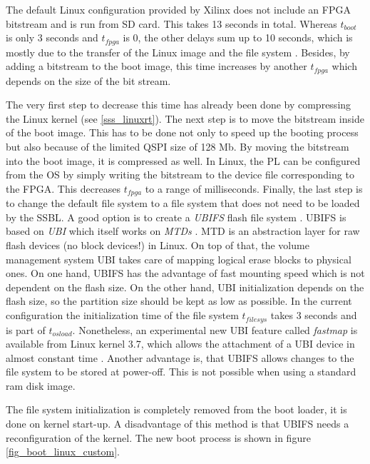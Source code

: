 The default Linux configuration provided by Xilinx does not include an \ac{FPGA} bitstream and is run from \ac{SD} card.
This takes 13 seconds in total.
Whereas $t_{boot}$ is only 3 seconds and $t_{fpga}$ is 0, the other delays sum up to 10 seconds, which is mostly due to the transfer of the Linux image and the file system . 
Besides, by adding a bitstream to the boot image, this time increases by another $ t_{fpga} $ which depends on the size of the bit stream.   
\par
The very first step to decrease this time has already been done by compressing the Linux kernel (see \ref{sss_linuxrt}).
The next step is to move the bitstream inside of the boot image.
This has to be done not only to speed up the booting process but also because of the limited \ac{QSPI} size of 128 Mb.
By moving the bitstream into the boot image, it is compressed as well. 
In Linux, the \ac{PL} can be configured from the \ac{OS} by simply writing the bitstream to the device file corresponding to the \ac{FPGA}. 
This decreases $t_{fpga}$ to a range of milliseconds. 
Finally, the last step is to change the default file system to a file system that does not need to be loaded by the \ac{SSBL}.
A good option is to create a \textit{\ac{UBIFS}} flash file system \cite{ubifs}.
\ac{UBIFS} is based on \textit{\ac{UBI}} which itself works on \textit{\acp{MTD}} \cite{mtd}.
\ac{MTD} is an abstraction layer for raw flash devices (no block devices!) in Linux.
On top of that, the volume management system \ac{UBI} takes care of mapping logical erase blocks to physical ones.  
On one hand, \ac{UBIFS} has the advantage of fast mounting speed which is not dependent on the flash size.
On the other hand, \ac{UBI} initialization depends on the flash size, so the partition size should be kept as low as possible.
In the current configuration the initialization time of the file system $t_{filesys}$ takes 3 seconds and is part of $t_{osload}$.
Nonetheless, an experimental new \ac{UBI} feature called \textit{fastmap} is available from Linux kernel 3.7, which allows the attachment of a \ac{UBI} device in almost constant time \cite{ubi}.
Another advantage is, that \ac{UBIFS} allows changes to the file system to be stored at power-off.
This is not possible when using a standard ram disk image.
\par
The file system initialization is completely removed from the boot loader, it is done on kernel start-up.
A disadvantage of this method is that \ac{UBIFS} needs a reconfiguration of the kernel.
The new boot process is shown in figure \ref{fig_boot_linux_custom}. 

